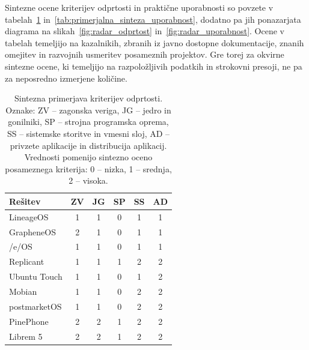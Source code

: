 \documentclass[a4paper,12pt,openright]{book}
\begin{document}
Sintezne ocene kriterijev odprtosti in praktične uporabnosti so povzete v tabelah~\ref{tab:primerjalna_sinteza_odprtost} in~\ref{tab:primerjalna_sinteza_uporabnost}, dodatno pa jih ponazarjata diagrama na slikah~\ref{fig:radar_odprtost} in~\ref{fig:radar_uporabnost}.
Ocene v tabelah temeljijo na kazalnikih, zbranih iz javno dostopne dokumentacije, znanih omejitev in razvojnih usmeritev posameznih projektov.
Gre torej za okvirne sintezne ocene, ki temeljijo na razpoložljivih podatkih in strokovni presoji, ne pa za neposredno izmerjene količine.

\begin{table}[htb]
\centering
\small
\setlength{\tabcolsep}{4pt}
\renewcommand{\arraystretch}{1.1}
\begin{tabular}{lccccc}
\hline
\textbf{Rešitev} & \textbf{ZV} & \textbf{JG} & \textbf{SP} & \textbf{SS} & \textbf{AD} \\
\hline
LineageOS    & 1 & 1 & 0 & 1 & 1 \\
GrapheneOS   & 2 & 1 & 0 & 1 & 1 \\
/e/OS        & 1 & 1 & 0 & 1 & 1 \\
Replicant    & 1 & 1 & 1 & 2 & 2 \\
Ubuntu Touch & 1 & 1 & 0 & 1 & 2 \\
Mobian       & 1 & 1 & 0 & 2 & 2 \\
postmarketOS & 1 & 1 & 0 & 2 & 2 \\
PinePhone    & 2 & 2 & 1 & 2 & 2 \\
Librem 5     & 2 & 2 & 1 & 2 & 2 \\
\hline
\end{tabular}
\caption{Sintezna primerjava kriterijev odprtosti. Oznake: ZV -- zagonska veriga, JG -- jedro in gonilniki, SP -- strojna programska oprema, SS -- sistemske storitve in vmesni sloj, AD -- privzete aplikacije in distribucija aplikacij. Vrednosti pomenijo sintezno oceno posameznega kriterija: 0 -- nizka, 1 -- srednja, 2 -- visoka.}
\label{tab:primerjalna_sinteza_odprtost}
\end{table}
\end{document}
